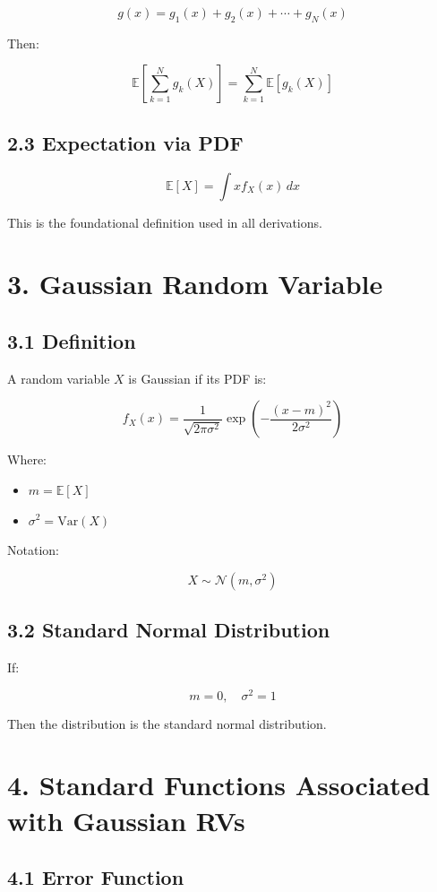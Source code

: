 \documentclass[12pt]{article}
\begin{document}
\[
g(x) = g_1(x) + g_2(x) + \cdots + g_N(x)
\]

Then:

\[
\mathbb{E}\left[\sum_{k=1}^{N} g_k(X)\right] = \sum_{k=1}^{N} \mathbb{E}[g_k(X)]
\]

\subsection*{2.3 Expectation via PDF}

\[
\mathbb{E}[X] = \int x f_X(x)\, dx
\]

This is the foundational definition used in all derivations.

\section*{3. Gaussian Random Variable}

\subsection*{3.1 Definition}

A random variable $X$ is Gaussian if its PDF is:

\[
f_X(x) = \frac{1}{\sqrt{2\pi\sigma^2}} \exp\left(-\frac{(x-m)^2}{2\sigma^2}\right)
\]

Where:
\begin{itemize}
\item $m = \mathbb{E}[X]$
\item $\sigma^2 = \mathrm{Var}(X)$
\end{itemize}

Notation:

\[
X \sim \mathcal{N}(m,\sigma^2)
\]

\subsection*{3.2 Standard Normal Distribution}

If:

\[
m = 0, \quad \sigma^2 = 1
\]

Then the distribution is the standard normal distribution.

\section*{4. Standard Functions Associated with Gaussian RVs}

\subsection*{4.1 Error Function}
\end{document}
